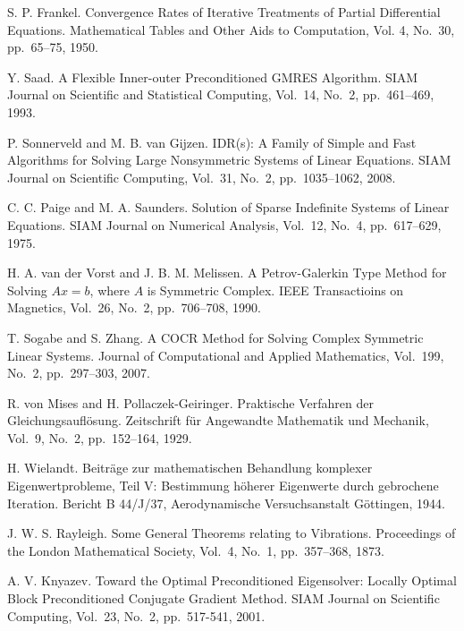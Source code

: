 \documentclass[a4paper]{jarticle}
\begin{document}
{{\begin{thebibliography}{10}
S. P. Frankel.
\newblock Convergence Rates of Iterative Treatments of Partial
	Differential Equations.
\newblock Mathematical Tables and Other Aids to Computation, Vol. 4, No.~30, 
	pp.\ 65--75, 1950.

Y. Saad.
\newblock A Flexible Inner-outer Preconditioned GMRES Algorithm.
\newblock SIAM Journal on Scientific and Statistical Computing, Vol.~14, No.~2, pp.\ 461--469, 1993.

P. Sonnerveld and M. B. van Gijzen.
\newblock IDR(s): A Family of Simple and Fast Algorithms for Solving Large Nonsymmetric Systems of Linear Equations.
\newblock SIAM Journal on Scientific Computing, Vol.~31, No.~2, pp.\ 1035--1062, 2008.

C. C. Paige and M. A. Saunders.
\newblock Solution of Sparse Indefinite Systems of Linear Equations.
\newblock SIAM Journal on Numerical Analysis, Vol.~12, No.~4, pp.\ 617--629, 1975.

H. A. van der Vorst and J. B. M. Melissen.
\newblock A Petrov-Galerkin Type Method for Solving $Ax=b$, where $A$ is Symmetric Complex.
\newblock IEEE Transactioins on Magnetics, Vol.~26, No.~2, pp.\ 706--708, 1990.

T. Sogabe and S. Zhang.
\newblock A COCR Method for Solving Complex Symmetric Linear Systems.
\newblock Journal of Computational and Applied Mathematics, Vol.~199, No.~2, pp.\ 297--303, 2007.

R. von Mises and H. Pollaczek-Geiringer.
\newblock Praktische Verfahren der Gleichungsaufl\"osung.
\newblock Zeitschrift f\"ur Angewandte Mathematik und Mechanik, Vol.~9, No.~2, pp.\ 152--164, 1929.

H. Wielandt.
\newblock Beitr\"age zur mathematischen Behandlung komplexer
	Eigenwertprobleme, Teil V: Bestimmung h\"oherer Eigenwerte durch
	gebrochene Iteration.
\newblock Bericht B 44/J/37, Aerodynamische Versuchsanstalt G\"ottingen, 1944.

J. W. S. Rayleigh.
\newblock Some General Theorems relating to Vibrations.
\newblock Proceedings of the London Mathematical Society, Vol.~4, No.~1,
	pp.\ 357--368, 1873.

A. V. Knyazev.
\newblock Toward the Optimal Preconditioned Eigensolver: Locally Optimal
	Block Preconditioned Conjugate Gradient Method.
\newblock SIAM Journal on Scientific Computing, Vol.~23, No.~2, pp.\ 517-541, 2001. 


\end{thebibliography}}}
\end{document}
